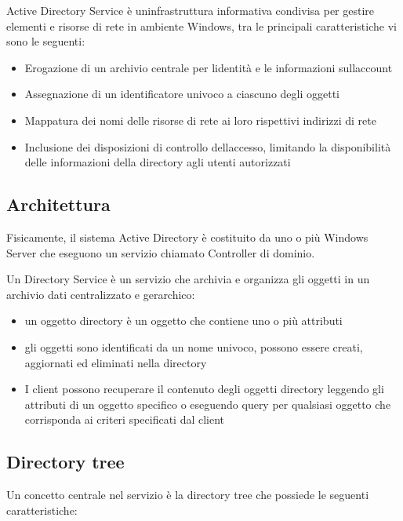 Active Directory Service è un\textquotesingle infrastruttura informativa
condivisa per gestire elementi e risorse di rete in ambiente Windows,
tra le principali caratteristiche vi sono le seguenti:

\begin{itemize}
\item
  Erogazione di un archivio centrale per l\textquotesingle identità e le
  informazioni sull\textquotesingle account
\item
  Assegnazione di un identificatore univoco a ciascuno degli oggetti
\item
  Mappatura dei nomi delle risorse di rete ai loro rispettivi indirizzi
  di rete
\item
  Inclusione dei disposizioni di controllo dell\textquotesingle accesso,
  limitando la disponibilità delle informazioni della directory agli
  utenti autorizzati
\end{itemize}

\subsection{Architettura}\label{architettura}

Fisicamente, il sistema Active Directory è costituito da uno o più
Windows Server che eseguono un servizio chiamato Controller di dominio.

Un Directory Service è un servizio che archivia e organizza gli oggetti
in un archivio dati centralizzato e gerarchico:

\begin{itemize}
\item
  un oggetto directory è un oggetto che contiene uno o più attributi
\item
  gli oggetti sono identificati da un nome univoco, possono essere
  creati, aggiornati ed eliminati nella directory
\item
  I client possono recuperare il contenuto degli oggetti directory
  leggendo gli attributi di un oggetto specifico o eseguendo query per
  qualsiasi oggetto che corrisponda ai criteri specificati dal client
\end{itemize}

\subsection{Directory tree}\label{directory-tree}

Un concetto centrale nel servizio è la directory tree che possiede le
seguenti caratteristiche:

